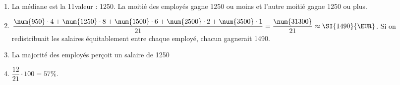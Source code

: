 %
%
    \begin{enumerate}
        \item
        La médiane est la 11\ieme valeur : \SI{1250}{\EUR}. La moitié des employés gagne \SI{1250}{\EUR} ou moins et l'autre moitié gagne \SI{1250}{\EUR} ou plus.
        \item
        $\dfrac{\num{950}\cdot 4 + \num{1250} \cdot 8 + \num{1500} \cdot 6 + \num{2500} \cdot 2 + \num{3500} \cdot 1}{21} = \dfrac{\num{31300}}{21}\approx\SI{1490}{\EUR}$. Si on redistribuait les salaires équitablement entre chaque employé, chacun gagnerait \SI{1490}{\EUR}.
        \item
        La majorité des employés perçoit un salaire de \SI{1250}{\EUR}
        \item
        $\dfrac{12}{21}\cdot 100 = 57\%$.
    \end{enumerate}
